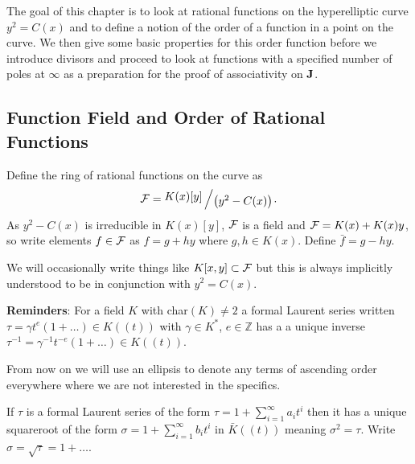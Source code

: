 \documentclass[english,11pt,a4paper]{article}
\begin{document}
The goal of this chapter is to look at rational functions on the hyperelliptic curve $y^2 = C(x)$ and to define a notion of the order of a function in a point on the curve. We then give some basic properties for this order function before we introduce divisors and proceed to look at functions with a specified number of poles at $\infty$ as a preparation for the proof of associativity on $\mathbf{J}$. %

\subsection{Function Field and Order of Rational Functions}

\begin{defin}
	Define the ring of rational functions on the curve as
	\begin{align*}
	  \F = \bigslant{K(x)[y]}{\big(y^2-C(x)\big)}.
	\end{align*}
  As $y^2-C(x)$ is irreducible in $K(x)[y]$, $\mathcal{F}$ is a field
  and $\mathcal{F} = K(x) + K(x) y$, so write elements $f \in \mathcal{F}$ as $f = g + hy$ where $g,h \in K(x)$. Define $\bar f = g - hy$.

  We will occasionally write things like $K[x,y] \subset \mathcal{F}$ but this is always implicitly understood to be in conjunction with $y^2=C(x)$.
\end{defin}

\vspace{3mm}

\textbf{Reminders}: For a field $K$ with char$(K) \neq 2$ a formal Laurent series written $\tau = \gamma t^e (1 + \dots)\in K (\! (t)\! )$ with $\gamma \in K^*$, $e \in \mathds{Z}$ has a a unique inverse $\tau^{-1} = \gamma^{-1} t^{-e} (1 + \dots) \in K (\! (t)\! )$.

From now on we will use an ellipsis to denote any terms of ascending order everywhere where we are not interested in the specifics.

If $\tau$ is a formal Laurent series of the form $\tau = 1 + \sum_{i = 1}^{\infty} a_i t^i$ then it has a unique squareroot of the form $\sigma = 1+\sum_{i = 1}^{\infty} b_i t^i$ in $\bar K (\! (t)\! )$ meaning $\sigma^2 = \tau$. Write $\sigma = \sqrt \tau = 1 + \dots$.
\end{document}
